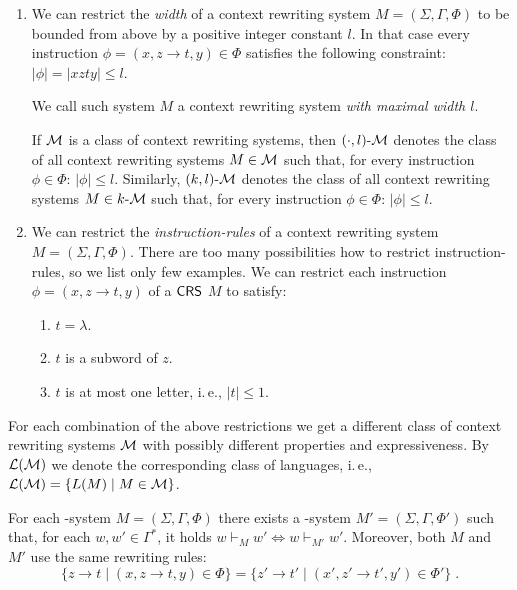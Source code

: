 \begin{definition}
\begin{enumerate}
\item\label{restriction:width}
We can restrict the \emph{width} of a context rewriting system $M=(\Sigma, \Gamma, \Phi)$ to be bounded from above by a positive integer constant $l$. In that case every instruction $\phi = (x, z \to t, y) \in \Phi$ satisfies the following constraint: $|\phi| = |xzty| \le l$.

We call such system $M$ a context rewriting system \emph{with maximal width $l$}.

If $\textup{\sf $\mathcal{M}$}$ is a class of context rewriting systems, then $\textup{\sf $(\cdot,l)$-\textup{\sf $\mathcal{M}$}}$ denotes the class of all context rewriting systems $M \in \textup{\sf $\mathcal{M}$}$ such that, for every instruction $\phi \in \Phi$: $|\phi| \le l$. Similarly, $\textup{\sf $(k,l)$-\textup{\sf $\mathcal{M}$}}$ denotes the class of all context rewriting systems $M \in \textup{\sf $k$-\textup{\sf $\mathcal{M}$}}$ such that, for every instruction $\phi \in \Phi$: $|\phi| \le l$.

\item\label{restriction:rules}
We can restrict the \emph{instruction-rules} of a context rewriting system $M=(\Sigma, \Gamma, \Phi)$. There are too many possibilities how to restrict instruction-rules, so we list only few examples. We can restrict each instruction $\phi = (x, z \to t, y)$ of a
$\textup{\sf CRS\/}$ $M$ to satisfy:
\begin{enumerate}
\item $t = \lambda$.
\item $t$ is a subword of $z$.
\item $t$ is at most one letter, i.\,e., $|t| \le 1$.
\end{enumerate}
\end{enumerate}
For each combination of the above restrictions we get a different class of context rewriting systems $\textup{\sf $\mathcal{M}$}$ with possibly different properties and expressiveness. By ${\cal L}(\textup{\sf $\mathcal{M}$})$ we denote the corresponding class of languages, i.\,e., ${\cal L}(\textup{\sf $\mathcal{M}$}) = \{L(M) \mid M \in \textup{\sf $\mathcal{M}$}\}$.
\end{definition}

\begin{theorem}\label{theorem:context_extension}
For each \kCRS[k]-system $M=(\Sigma, \Gamma, \Phi)$ there exists a \kCRS[(k+1)]-system $M'=(\Sigma, \Gamma, \Phi')$ such that, for each $w, w' \in \Gamma^*$, it holds $w \vdash_M w' \Leftrightarrow w \vdash_{M'} w'$. Moreover, both $M$ and $M'$ use the same rewriting rules:
$$\{ z \to t \mid (x, z \to t, y) \in \Phi \} = \{ z' \to t' \mid (x', z' \to t', y') \in \Phi' \}\;.$$
\end{theorem}

